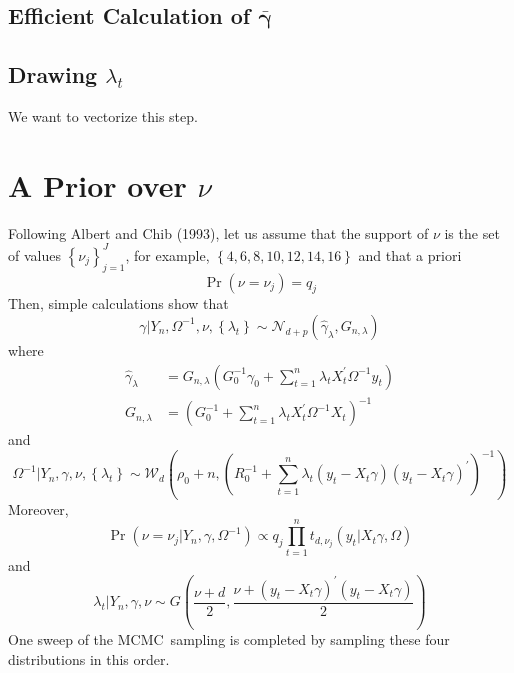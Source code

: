 \documentclass[12pt]{article}
\begin{document}
\subsection{Efficient Calculation of $\bar{\boldsymbol{\gamma}}$}
\subsection{Drawing $\lambda_t$}
We want to vectorize this step.

\section{A Prior over $\nu$}
Following Albert and Chib (1993), let us assume that the support of $\nu $
is the set of values $\left\{ \nu _{j}\right\} _{j=1}^{J}$, for example, $%
\left\{ 4,6,8,10,12,14,16\right\} $ and that a priori
\begin{equation*}
\Pr \left( \nu =\nu _{j}\right) =q_{j}
\end{equation*}%
Then, simple calculations show that
\begin{equation*}
\gamma |Y_{n},\Omega ^{-1},\nu ,\left\{ \lambda _{t}\right\} \sim \mathcal{N}%
_{d+p}\left( \hat{\gamma}_{\lambda },G_{n,\lambda }\right)
\end{equation*}%
where
\begin{align*}
\hat{\gamma}_{\lambda }& =G_{n,\lambda }\left( G_{0}^{-1}\gamma
_{0}+\sum_{t=1}^{n}\lambda _{t}X_{t}^{\prime }\Omega ^{-1}y_{t}\right)  \\
G_{n,\lambda }& =\left( G_{0}^{-1}+\sum_{t=1}^{n}\lambda _{t}X_{t}^{\prime
}\Omega ^{-1}X_{t}\right) ^{-1}
\end{align*}%
and
\begin{equation*}
\Omega ^{-1}|Y_{n},\gamma ,\nu ,\left\{ \lambda _{t}\right\} \sim \mathcal{W}%
_{d}\left( \rho _{0}+n,\left( R_{0}^{-1}+\sum_{t=1}^{n}\lambda _{t}\left(
y_{t}-X_{t}\gamma \right) \left( y_{t}-X_{t}\gamma \right) ^{\prime }\right)
^{-1}\right)
\end{equation*}%
Moreover,%
\begin{equation*}
\Pr \left( \nu =\nu _{j}|Y_{n},\gamma ,\Omega ^{-1}\right) \propto
q_{j}\prod\limits_{t=1}^{n}t_{d,\nu _{j}}\left( y_{t}|X_{t}\gamma ,\Omega
\right)
\end{equation*}%
and%
\begin{equation*}
\lambda _{t}|Y_{n},\gamma ,\nu \sim G\left( \frac{\nu +d}{2},\frac{\nu
+\left( y_{t}-X_{t}\gamma \right) ^{\prime }\left( y_{t}-X_{t}\gamma \right)
}{2}\right)
\end{equation*}%
One sweep of the MCMC\ sampling is completed by sampling these four
distributions in this order.
\end{document}
